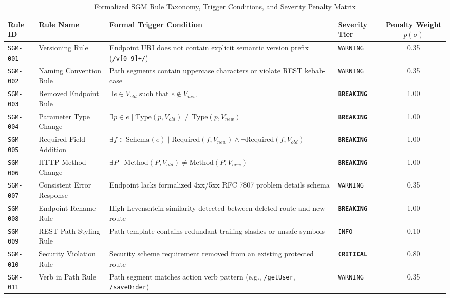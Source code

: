 \documentclass[conference]{IEEEtran}
\begin{document}
\begin{table}[t]
\caption{Formalized SGM Rule Taxonomy, Trigger Conditions, and Severity Penalty Matrix}
\label{tab:sgm_taxonomy}
\centering
\scriptsize
\begin{tabular}{@{}llllc@{}}
\toprule
\textbf{Rule ID} & \textbf{Rule Name} & \textbf{Formal Trigger Condition} & \textbf{Severity Tier} & \textbf{Penalty Weight $p(\sigma)$} \\
\midrule
\texttt{SGM-001} & Versioning Rule & Endpoint URI does not contain explicit semantic version prefix (\texttt{/v[0-9]+/}) & \texttt{WARNING} & 0.35 \\
\texttt{SGM-002} & Naming Convention Rule & Path segments contain uppercase characters or violate REST kebab-case & \texttt{WARNING} & 0.35 \\
\texttt{SGM-003} & Removed Endpoint Rule & $\exists e \in V_{old} \text{ such that } e \notin V_{new}$ & \textbf{\texttt{BREAKING}} & 1.00 \\
\texttt{SGM-004} & Parameter Type Change & $\exists p \in e \mid \text{Type}(p, V_{old}) \neq \text{Type}(p, V_{new})$ & \textbf{\texttt{BREAKING}} & 1.00 \\
\texttt{SGM-005} & Required Field Addition & $\exists f \in \text{Schema}(e) \mid \text{Required}(f, V_{new}) \land \neg \text{Required}(f, V_{old})$ & \textbf{\texttt{BREAKING}} & 1.00 \\
\texttt{SGM-006} & HTTP Method Change & $\exists P \mid \text{Method}(P, V_{old}) \neq \text{Method}(P, V_{new})$ & \textbf{\texttt{BREAKING}} & 1.00 \\
\texttt{SGM-007} & Consistent Error Response & Endpoint lacks formalized 4xx/5xx RFC 7807 problem details schema & \texttt{WARNING} & 0.35 \\
\texttt{SGM-008} & Endpoint Rename Rule & High Levenshtein similarity detected between deleted route and new route & \textbf{\texttt{BREAKING}} & 1.00 \\
\texttt{SGM-009} & REST Path Styling Rule & Path template contains redundant trailing slashes or unsafe symbols & \texttt{INFO} & 0.10 \\
\texttt{SGM-010} & Security Violation Rule & Security scheme requirement removed from an existing protected route & \textbf{\texttt{CRITICAL}} & 0.80 \\
\texttt{SGM-011} & Verb in Path Rule & Path segment matches action verb pattern (e.g., \texttt{/getUser}, \texttt{/saveOrder}) & \texttt{WARNING} & 0.35 \\
\bottomrule
\end{tabular}
\end{table}
\end{document}
